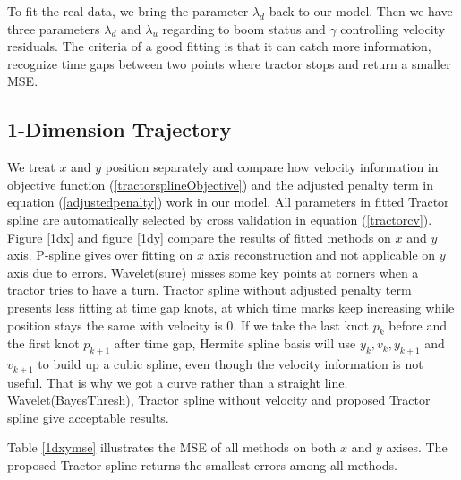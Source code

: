 To fit the real data, we bring the parameter $\lambda_d$ back to our model. Then we have three parameters $\lambda_d$ and $\lambda_u$ regarding to boom status and $\gamma$ controlling velocity residuals. The criteria of a good fitting is that it can catch more information, recognize time gaps between two points where tractor stops and return a smaller MSE. 

\subsection{1-Dimension Trajectory}

We treat $x$ and $y$ position separately and compare how velocity information in objective function (\ref{tractorsplineObjective}) and the adjusted penalty term in equation (\ref{adjustedpenalty}) work in our model. All parameters in fitted Tractor spline are automatically selected by cross validation in equation (\ref{tractorcv}). Figure \ref{1dx} and figure \ref{1dy} compare the results of fitted methods on $x$ and $y$ axis. P-spline gives over fitting on $x$ axis reconstruction and not applicable on $y$ axis due to errors. Wavelet(sure) misses some key points at corners when a tractor tries to have a turn. Tractor spline without adjusted penalty term presents less fitting at time gap knots, at which time marks keep increasing while position stays the same with velocity is 0. If we take the last knot $p_k$ before and the first knot $p_{k+1}$ after time gap, Hermite spline basis will use $y_k, v_k, y_{k+1}$ and $v_{k+1}$ to build up a cubic spline, even though the velocity information is not useful. That is why we got a curve rather than a straight line. Wavelet(BayesThresh), Tractor spline without velocity and proposed Tractor spline give acceptable results.

Table \ref{1dxymse} illustrates the MSE of all methods on both $x$ and $y$ axises. The proposed Tractor spline returns the smallest errors among all methods.



